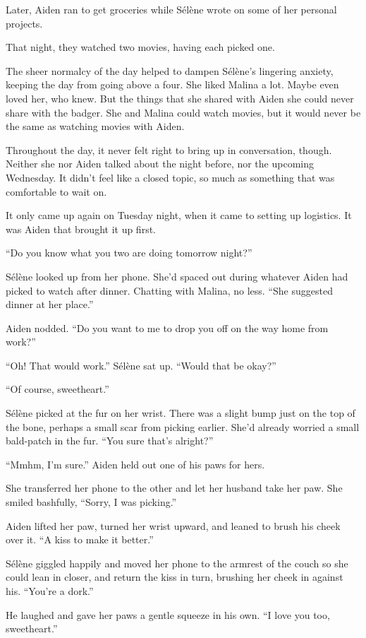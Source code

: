 Later, Aiden ran to get groceries while Sélène wrote on some of her personal projects.

That night, they watched two movies, having each picked one.

The sheer normalcy of the day helped to dampen Sélène's lingering anxiety, keeping the day from going above a four. She liked Malina a lot. Maybe even loved her, who knew. But the things that she shared with Aiden she could never share with the badger. She and Malina could watch movies, but it would never be the same as watching movies with Aiden.

Throughout the day, it never felt right to bring up in conversation, though. Neither she nor Aiden talked about the night before, nor the upcoming Wednesday. It didn't feel like a closed topic, so much as something that was comfortable to wait on.

It only came up again on Tuesday night, when it came to setting up logistics. It was Aiden that brought it up first.

``Do you know what you two are doing tomorrow night?''

Sélène looked up from her phone. She'd spaced out during whatever Aiden had picked to watch after dinner. Chatting with Malina, no less. ``She suggested dinner at her place.''

Aiden nodded. ``Do you want to me to drop you off on the way home from work?''

``Oh! That would work.'' Sélène sat up. ``Would that be okay?''

``Of course, sweetheart.''

Sélène picked at the fur on her wrist. There was a slight bump just on the top of the bone, perhaps a small scar from picking earlier. She'd already worried a small bald-patch in the fur. ``You sure that's alright?''

``Mmhm, I'm sure.'' Aiden held out one of his paws for hers.

She transferred her phone to the other and let her husband take her paw. She smiled bashfully, ``Sorry, I was picking.''

Aiden lifted her paw, turned her wrist upward, and leaned to brush his cheek over it. ``A kiss to make it better.''

Sélène giggled happily and moved her phone to the armrest of the couch so she could lean in closer, and return the kiss in turn, brushing her cheek in against his. ``You're a dork.''

He laughed and gave her paws a gentle squeeze in his own. ``I love you too, sweetheart.''

